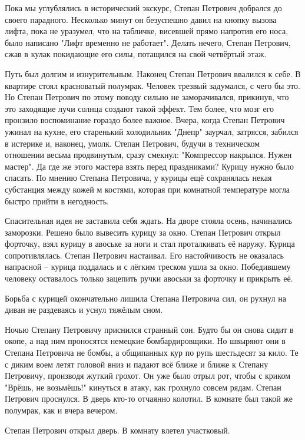 Пока мы углублялись в исторический экскурс, Степан Петрович добрался до своего
парадного. Несколько минут он безуспешно давил на кнопку вызова лифта, пока не
уразумел, что на табличке, висевшей прямо напротив его носа, было написано
"Лифт временно не работает". Делать нечего, Степан Петрович, сжав в кулак
покидающие его силы, потащился на свой четвёртый этаж.

Путь был долгим и изнурительным. Наконец Степан Петрович ввалился к себе. В
квартире стоял красноватый полумрак. Человек трезвый задумался, с чего бы это.
Но Степан Петрович по этому поводу сильно не заморачивался, прикинув, что это
заходящие лучи солнца создают такой эффект. Тем более, что мозг его пронзило
воспоминание гораздо более важное. Вчера, когда Степан Петрович ужинал на
кухне, его старенький холодильник "Днепр" заурчал, затрясся, забился в истерике
и, наконец, умолк. Степан Петрович, будучи в техническом отношении весьма
продвинутым, сразу смекнул: "Компрессор накрылся. Нужен мастер". Да где же
этого мастера взять перед праздниками? Курицу нужно было спасать. По мнению
Степана Петровича, у курицы ещё сохранялась некая субстанция между кожей м
костями, которая при комнатной температуре могла быстро прийти в негодность.

Спасительная идея не заставила себя ждать. На дворе стояла осень, начинались
заморозки. Решено было вывесить курицу за окно. Степан Петрович открыл
форточку, взял курицу в авоське за ноги и стал проталкивать её наружу. Курица
сопротивлялась. Степан Петрович настаивал. Его настойчивость не оказалась
напрасной – курица поддалась и с лёгким треском ушла за окно. Победившему
человеку оставалось только зацепить ручки авоськи за форточку и прикрыть её.

Борьба с курицей окончательно лишила Степана Петровича сил, он рухнул на диван
не раздеваясь и уснул тяжёлым сном.

Ночью Степану Петровичу приснился странный сон. Будто бы он снова сидит в
окопе, а над ним проносятся немецкие бомбардировщики. Но швыряют они в Степана
Петровича не бомбы, а общипанных кур по рупь шестьдесят за кило. Те с диким
воем летят головой вниз и падают всё ближе и ближе к Степану Петровичу,
производя жуткий грохот. Он уже было отрыл рот, чтобы с криком "Врёшь, не
возьмёшь!" кинуться в атаку, как грохнуло совсем рядам. Степан Петрович
проснулся. В дверь кто-то отчаянно колотил. В комнате был такой же полумрак,
как и вчера вечером.

Степан Петрович открыл дверь. В комнату влетел участковый.

